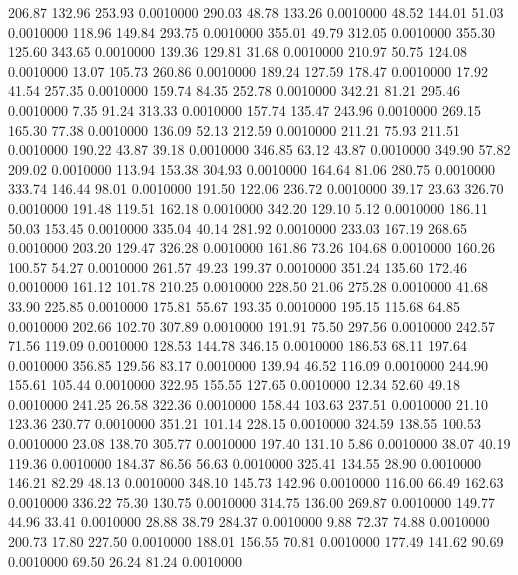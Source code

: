  206.87  132.96  253.93   0.0010000
 290.03   48.78  133.26   0.0010000
  48.52  144.01   51.03   0.0010000
 118.96  149.84  293.75   0.0010000
 355.01   49.79  312.05   0.0010000
 355.30  125.60  343.65   0.0010000
 139.36  129.81   31.68   0.0010000
 210.97   50.75  124.08   0.0010000
  13.07  105.73  260.86   0.0010000
 189.24  127.59  178.47   0.0010000
  17.92   41.54  257.35   0.0010000
 159.74   84.35  252.78   0.0010000
 342.21   81.21  295.46   0.0010000
   7.35   91.24  313.33   0.0010000
 157.74  135.47  243.96   0.0010000
 269.15  165.30   77.38   0.0010000
 136.09   52.13  212.59   0.0010000
 211.21   75.93  211.51   0.0010000
 190.22   43.87   39.18   0.0010000
 346.85   63.12   43.87   0.0010000
 349.90   57.82  209.02   0.0010000
 113.94  153.38  304.93   0.0010000
 164.64   81.06  280.75   0.0010000
 333.74  146.44   98.01   0.0010000
 191.50  122.06  236.72   0.0010000
  39.17   23.63  326.70   0.0010000
 191.48  119.51  162.18   0.0010000
 342.20  129.10    5.12   0.0010000
 186.11   50.03  153.45   0.0010000
 335.04   40.14  281.92   0.0010000
 233.03  167.19  268.65   0.0010000
 203.20  129.47  326.28   0.0010000
 161.86   73.26  104.68   0.0010000
 160.26  100.57   54.27   0.0010000
 261.57   49.23  199.37   0.0010000
 351.24  135.60  172.46   0.0010000
 161.12  101.78  210.25   0.0010000
 228.50   21.06  275.28   0.0010000
  41.68   33.90  225.85   0.0010000
 175.81   55.67  193.35   0.0010000
 195.15  115.68   64.85   0.0010000
 202.66  102.70  307.89   0.0010000
 191.91   75.50  297.56   0.0010000
 242.57   71.56  119.09   0.0010000
 128.53  144.78  346.15   0.0010000
 186.53   68.11  197.64   0.0010000
 356.85  129.56   83.17   0.0010000
 139.94   46.52  116.09   0.0010000
 244.90  155.61  105.44   0.0010000
 322.95  155.55  127.65   0.0010000
  12.34   52.60   49.18   0.0010000
 241.25   26.58  322.36   0.0010000
 158.44  103.63  237.51   0.0010000
  21.10  123.36  230.77   0.0010000
 351.21  101.14  228.15   0.0010000
 324.59  138.55  100.53   0.0010000
  23.08  138.70  305.77   0.0010000
 197.40  131.10    5.86   0.0010000
  38.07   40.19  119.36   0.0010000
 184.37   86.56   56.63   0.0010000
 325.41  134.55   28.90   0.0010000
 146.21   82.29   48.13   0.0010000
 348.10  145.73  142.96   0.0010000
 116.00   66.49  162.63   0.0010000
 336.22   75.30  130.75   0.0010000
 314.75  136.00  269.87   0.0010000
 149.77   44.96   33.41   0.0010000
  28.88   38.79  284.37   0.0010000
   9.88   72.37   74.88   0.0010000
 200.73   17.80  227.50   0.0010000
 188.01  156.55   70.81   0.0010000
 177.49  141.62   90.69   0.0010000
  69.50   26.24   81.24   0.0010000
